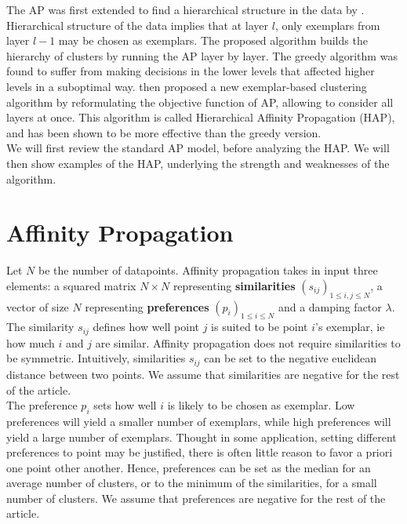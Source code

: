 \documentclass{ipol}
\begin{document}
The AP was first extended to find a hierarchical structure in the data by
\cite{Xiao07jointaffinity}. Hierarchical structure of the data implies that at
layer $l$, only exemplars from layer $l - 1$ may be chosen as exemplars. The
proposed algorithm builds the hierarchy of clusters by running the AP layer by
layer. The greedy algorithm was found to suffer from making decisions in the
lower levels that affected higher levels in a suboptimal way. \cite{hap} then
proposed a new exemplar-based clustering algorithm by reformulating the
objective function of AP, allowing to consider all layers at once. This
algorithm is called Hierarchical Affinity Propagation (HAP), and has been
shown to be more effective than the greedy version. \\

We will first review the standard AP model, before analyzing the HAP. We will
then show examples of the HAP, underlying the strength and weaknesses of the
algorithm.

\section{Affinity Propagation}

Let $N$ be the number of datapoints. Affinity propagation takes in input three
elements: a squared matrix $N \times N$ representing \textbf{similarities}
$(s_{ij})_{1 \leq i, j \leq N}$, a vector of size $N$ representing
\textbf{preferences} $(p_i)_{1 \leq i \leq N}$ and a damping factor $\lambda$.
\\

The similarity $s_{ij}$ defines how well point $j$ is suited to be point $i$'s
exemplar, ie how much $i$ and $j$ are similar. Affinity propagation does not
require similarities to be symmetric. Intuitively, similarities $s_{ij}$ can
be set to the negative euclidean distance between two points. We assume that
similarities are negative for the rest of the article.\\

The preference $p_i$ sets how well $i$ is likely to be chosen as exemplar. Low
preferences will yield a smaller number of exemplars, while high preferences
will yield a large number of exemplars. Thought in some application, setting
different preferences to point may be justified, there is often little reason
to favor a priori one point other another. Hence, preferences can be set as
the median for an average number of clusters, or to the minimum of the
similarities, for a small number of clusters. We assume that preferences are
negative for the rest of the article.\\
\end{document}
